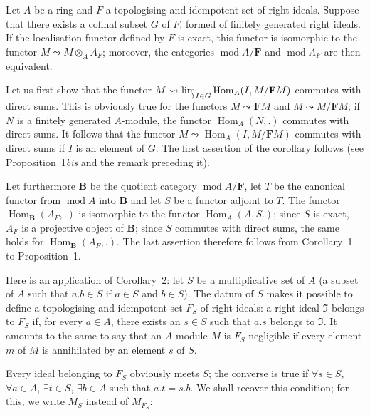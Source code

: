 \begin{corollary}
Let $A$ be a ring and $F$ a topologising and idempotent set of right
ideals. Suppose that there exists a cofinal subset $G$ of $F$, formed
of finitely generated right ideals. If the localisation functor defined
by $F$ is exact, this functor is isomorphic to the functor
$M\leadsto M\otimes_A A_F$; moreover, the categories
$\operatorname{mod} A/\mathbf{F}$ and $\operatorname{mod} A_F$ are then
equivalent.
\end{corollary}

Let us first show that the functor
$M\leadsto\varinjlim_{I\in G}\operatorname{Hom}_A(I,M/\mathbf{F}M)$
commutes with direct sums. This is obviously true for the functors
$M\leadsto\mathbf{F}M$ and $M\leadsto M/\mathbf{F}M$; if $N$ is a
finitely generated $A$-module, the functor $\operatorname{Hom}_A(N,.)$
commutes with direct sums. It follows that the functor
$M\leadsto\operatorname{Hom}_A(I,M/\mathbf{F}M)$ commutes with direct
sums if $I$ is an element of $G$. The first assertion of the corollary
follows (see Proposition~1\textit{bis} and the remark preceding it).

Let furthermore $\mathbf{B}$ be the quotient category
$\operatorname{mod} A/\mathbf{F}$, let $T$ be the canonical functor from
$\operatorname{mod} A$ into $\mathbf{B}$ and let $S$ be a functor
adjoint to $T$. The functor $\operatorname{Hom}_{\mathbf{B}}(A_F,.)$ is
isomorphic to the functor $\operatorname{Hom}_A(A,S.)$; since $S$ is
exact, $A_F$ is a projective object of $\mathbf{B}$; since $S$ commutes
with direct sums, the same holds for
$\operatorname{Hom}_{\mathbf{B}}(A_F,.)$. The last assertion therefore
follows from Corollary~1 to Proposition~1.

Here is an application of Corollary~2: let $S$ be a multiplicative set
of $A$ (a subset of $A$ such that $a.b\in S$ if $a\in S$ and $b\in S$).
The datum of $S$ makes it possible to define a topologising and
idempotent set $F_S$ of right ideals: a right ideal $\mathfrak{I}$
belongs to $F_S$ if, for every $a\in A$, there exists an $s\in S$ such
that $a.s$ belongs to $\mathfrak{I}$. It amounts to the same to say
that an $A$-module $M$ is $F_S$-negligible if every element $m$ of $M$
is annihilated by an element $s$ of $S$.

Every ideal belonging to $F_S$ obviously meets $S$; the converse is
true if $\forall s\in S$, $\forall a\in A$, $\exists t\in S$,
$\exists b\in A$ such that $a.t=s.b$. We shall recover this condition;
for this, we write $M_S$ instead of $M_{F_S}$:

